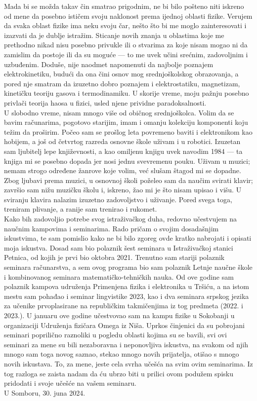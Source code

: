 \documentclass[a4paper]{article}
\begin{document}
Mada bi se možda takav čin smatrao prigodnim, ne bi bilo pošteno niti iskreno od mene da posebno ističem svoju naklonost prema ijednoj oblasti fizike. Verujem da svaka oblast fizike ima neku svoju čar, nešto što bi me moglo zainteresovati i izazvati da je dublje istražim. Sticanje novih znanja u oblastima koje me prethodno nikad nisu posebno privukle ili o stvarima za koje nisam mogao ni da zamislim da postoje ili da su moguće --- to me uvek učini srećnim, zadovoljnim i uzbuđenim. Doduše, nije naodmet napomenuti da najbolje poznajem elektrokinetiku, budući da ona čini osnov mog srednjoškolskog obrazovanja, a pored nje smatram da izuzetno dobro poznajem i elektrostatiku, magnetizam, kinetičku teoriju gasova i termodinamiku. U skorije vreme, moju pažnju posebno privlači teorija haosa u fizici, usled njene prividne paradoksalnosti.\\

U slobodno vreme, nisam mnogo više od običnog srednjoškolca. Volim da se bavim računarima, pogotovo starijim, imam i omanju kolekciju komponenti koju težim da proširim. Počeo sam se prošlog leta povremeno baviti i elektronikom kao hobijem, a još od četvrtog razreda osnovne škole uživam i u robotici. Izuzetan sam ljubitelj lepe književnosti, a kao omiljenu knjigu uvek navodim 1984 --- ta knjiga mi se posebno dopada jer nosi jednu svevremenu pouku. Uživam u muzici; nemam strogo određene žanrove koje volim, već slušam štagod mi se dopadne. Zbog ljubavi prema muzici, u osnovnoj školi poželeo sam da naučim svirati klavir; završio sam nižu muzičku školu i, iskreno, žao mi je što nisam upisao i višu. U sviranju klavira nalazim izuzetno zadovoljstvo i uživanje. Pored svega toga, treniram plivanje, a ranije sam trenirao i rukomet.\\



Kako bih zadovoljio potrebe svog istraživačkog duha, redovno učestvujem na naučnim kampovima i seminarima. Rado pričam o svojim dosadašnjim iskustvima, te sam pomislio kako ne bi bilo zgoreg ovde kratko nabrojati i opisati moja iskustva. Dosad sam bio polaznik šest seminara u Istraživačkoj stanici Petnica, od kojih je prvi bio oktobra 2021. Trenutno sam stariji polaznik seminara računarstva, a sem ovog programa bio sam polaznik Letnje naučne škole i kombinovanog seminara matematičko-tehničkih nauka. Od ove godine sam polaznik kampova udruženja Primenjena fizika i elektronika u Tršiću, a na istom mestu sam pohađao i seminar lingvistike 2023, kao i dva seminara srpskog jezika za učenike prvoplasirane na republičkim takmičenjima iz tog predmeta (2022. i 2023.). U januaru ove godine učestvovao sam na kampu fizike u Sokobanji u organizaciji Udruženja fizičara Omega iz Niša. Uprkos činjenici da su pobrojani seminari poprilično raznoliki u pogledu oblasti kojima su se bavili, svi ovi seminari za mene su bili nezaboravna i neponovljiva iskustva, na svakom od njih mnogo sam toga novog saznao, stekao mnogo novih prijatelja, otišao s mnogo novih iskustava. To, za mene, jeste cela svrha učešća na svim ovim seminarima. Iz tog razloga se zaista nadam da ću ubrzo biti u prilici ovom podužem spisku pridodati i svoje učešće na vašem seminaru.\\

U Somboru, 30. juna 2024.
\end{document}
